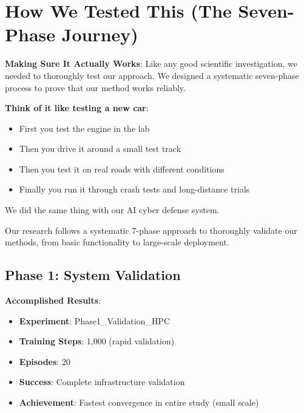 \documentclass[11pt]{article}
\begin{document}
\section{How We Tested This (The Seven-Phase Journey)}

\begin{foundation}
\textbf{Making Sure It Actually Works}: Like any good scientific investigation, we needed to thoroughly test our approach. We designed a systematic seven-phase process to prove that our method works reliably.
\end{foundation}

\begin{intuition}
\textbf{Think of it like testing a new car}:
\begin{itemize}
\item First you test the engine in the lab
\item Then you drive it around a small test track
\item Then you test it on real roads with different conditions
\item Finally you run it through crash tests and long-distance trials
\end{itemize}

We did the same thing with our AI cyber defense system.
\end{intuition}

\begin{foundation}
Our research follows a systematic 7-phase approach to thoroughly validate our methods, from basic functionality to large-scale deployment.
\end{foundation}

\subsection{Phase 1: System Validation}
\begin{example}
\textbf{Accomplished Results}:
\begin{itemize}
\item \textbf{Experiment}: Phase1\_Validation\_HPC
\item \textbf{Training Steps}: 1,000 (rapid validation)
\item \textbf{Episodes}: 20
\item \textbf{Success}: Complete infrastructure validation
\item \textbf{Achievement}: Fastest convergence in entire study (small scale)
\end{itemize}
\end{example}
\end{document}

